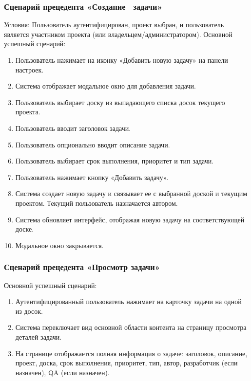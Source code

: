 \subsubsection{Сценарий прецедента «Создание  задачи»}
Условия: Пользователь аутентифицирован, проект выбран, и пользователь является участником проекта (или владельцем/администратором).
Основной успешный сценарий:
\begin{enumerate}
	\item Пользователь нажимает на иконку «Добавить новую задачу» на панели настроек.
	\item Система отображает модальное окно для добавления задачи.
	\item Пользователь выбирает доску из выпадающего списка досок текущего проекта.
	\item Пользователь вводит заголовок задачи.
	\item Пользователь опционально вводит описание задачи.
	\item Пользователь выбирает срок выполнения, приоритет и тип задачи.
	\item Пользователь нажимает кнопку «Добавить задачу».
	\item Система создает новую задачу и связывает ее с выбранной доской и текущим проектом. Текущий пользователь назначается автором.
	\item Система обновляет интерфейс, отображая новую задачу на соответствующей доске.
	\item Модальное окно закрывается.
\end{enumerate}

\subsubsection{Сценарий прецедента «Просмотр задачи»}
Основной успешный сценарий:
\begin{enumerate}
	\item Аутентифицированный пользователь нажимает на карточку задачи на одной из досок.
	\item Система переключает вид основной области контента на страницу просмотра деталей задачи.
	\item На странице отображается полная информация о задаче: заголовок, описание, проект, доска, срок выполнения, приоритет, тип, автор, разработчик (если назначен), QA (если назначен).
\end{enumerate}

